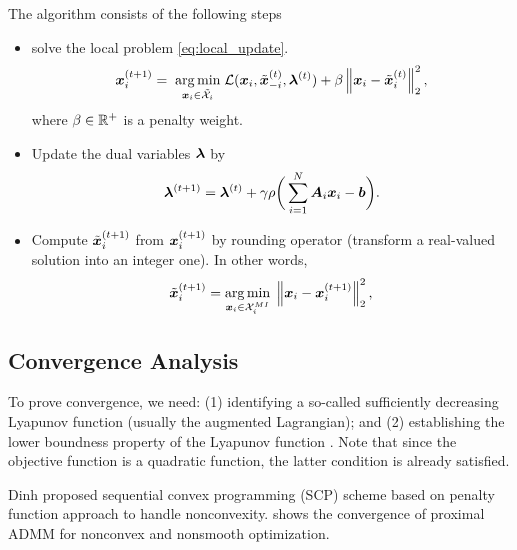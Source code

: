 \documentclass[twocolumn,amsthm]{autart}%
\theoremstyle{definition}
\theoremstyle{plain}
\begin{document}
The algorithm consists of the following steps
\begin{itemize}
\item {} solve the local problem \eqref{eq:local_update}.
\begin{equation}
\label{eq:local_update}
\boldsymbol{x}_i^{(t+1)} = \; \underset{\boldsymbol{x}_i \in \tilde{\mathcal{X}}_i}{\operatorname*{arg\,min}}  \; \mathcal{L} (\boldsymbol{x}_i, \tilde{\boldsymbol{x}}_{-i}^{(t)}, \boldsymbol{\lambda}^{(t)}) + \beta \left\lVert \boldsymbol{x}_i - \tilde{\boldsymbol{x}}_i^{(t)} \right\rVert_2^2,
\end{equation}
where $\beta \in \mathbb{R}^{+}$ is a penalty weight.

\item Update the dual variables $\boldsymbol{\lambda}$ by 
\begin{equation}
\boldsymbol{\lambda}^{(t+1)} = \boldsymbol{\lambda}^{(t)} + \gamma \rho \bigg( \sum_{i=1}^{N} \boldsymbol{A}_{i} \boldsymbol{x}_i - \boldsymbol{b} \bigg).
\end{equation}


\item Compute $\tilde{\boldsymbol{x}}_i^{(t+1)}$ from $\boldsymbol{x}_i^{(t+1)}$ by rounding operator (transform a real-valued solution into an integer one). 
In other words,
\begin{equation}
\tilde{\boldsymbol{x}}_i^{(t+1)} = \underset{\boldsymbol{x}_i \in \mathcal{X}_i^{\relax{MI}}}{\operatorname*{arg\,min}} \;
\left\lVert \boldsymbol{x}_i - \boldsymbol{x}_i^{(t+1)} \right\rVert_2^2,
\end{equation}
\end{itemize}


\subsection{Convergence Analysis}

To prove convergence, we need: (1) identifying a so-called sufficiently decreasing Lyapunov function (usually the augmented Lagrangian); and
(2) establishing the lower boundness property of the Lyapunov
function \cite{yang2022proximal}.
Note that since the objective function is a quadratic function, the latter condition is already satisfied.

Dinh \etal \cite{dinh2013dual} proposed sequential convex programming (SCP) scheme based on penalty function approach to handle nonconvexity.
\cite{yang2022proximal} shows the convergence of proximal ADMM for nonconvex and nonsmooth optimization.
\end{document}
